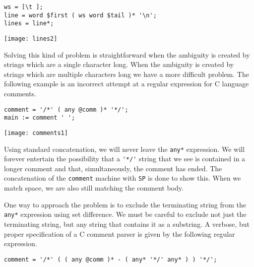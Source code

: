 \documentclass[letterpaper,11pt,oneside]{book}
\newenvironment{inline_code}{\def\baselinestretch{1}\vspace{12pt}\small}{}
\begin{document}
\begin{inline_code}
\begin{verbatim}
ws = [\t ];
line = word $first ( ws word $tail )* '\n';
lines = line*;
\end{verbatim}
\end{inline_code}

\begin{center}
\texttt{[image: lines2]}
\end{center}

Solving this kind of problem is straightforward when the ambiguity is created
by strings which are a single character long.  When the ambiguity is created by
strings which are multiple characters long we have a more difficult problem.
The following example is an incorrect attempt at a regular expression for C
language comments. 

\begin{inline_code}
\begin{verbatim}
comment = '/*' ( any @comm )* '*/';
main := comment ' ';
\end{verbatim}
\end{inline_code}

\begin{center}
\texttt{[image: comments1]}
\end{center}

Using standard concatenation, we will never leave the \verb|any*| expression.
We will forever entertain the possibility that a \verb|'*/'| string that we see
is contained in a longer comment and that, simultaneously, the comment has
ended.  The concatenation of the \verb|comment| machine with \verb|SP| is done
to show this. When we match space, we are also still matching the comment body.

One way to approach the problem is to exclude the terminating string
from the \verb|any*| expression using set difference. We must be careful to
exclude not just the terminating string, but any string that contains it as a
substring. A verbose, but proper specification of a C comment parser is given
by the following regular expression. 

\begin{inline_code}
\begin{verbatim}
comment = '/*' ( ( any @comm )* - ( any* '*/' any* ) ) '*/';
\end{verbatim}
\end{inline_code}
\end{document}
